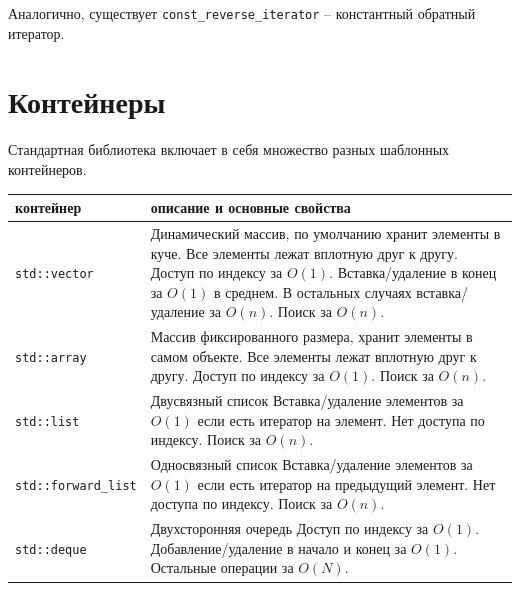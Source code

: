 \documentclass{article}
\begin{document}
Аналогично, существует \texttt{const\_reverse\_iterator} -- константный обратный итератор.

\newpage
\section*{Контейнеры}
Стандартная библиотека включает в себя множество разных шаблонных контейнеров.

\begin{center}
\bgroup
\def\arraystretch{2}%
\begin{tabular}{ p{3.3cm} | p{14cm} }
контейнер & описание и основные свойства \\ \hline

\texttt{std::vector} & 
Динамический массив, по умолчанию хранит элементы в куче. \newline 
Все элементы лежат вплотную друг к другу. \newline 
Доступ по индексу за $O(1)$. Вставка/удаление в конец за $O(1)$ в среднем. \newline
В остальных случаях вставка/удаление за $O(n)$. Поиск за $O(n)$.  \newline 
\\ \hline

\texttt{std::array} &
Массив фиксированного размера, хранит элементы в самом объекте. \newline 
Все элементы лежат вплотную друг к другу. \newline 
Доступ по индексу за $O(1)$. Поиск за $O(n)$. \newline 
\\ \hline

\texttt{std::list} &
Двусвязный список \newline 
Вставка/удаление элементов за $O(1)$ если есть итератор на элемент. \newline 
Нет доступа по индексу. Поиск за $O(n)$. \newline 
\\ \hline


\texttt{std::forward\_list} &
Односвязный список \newline 
Вставка/удаление элементов за $O(1)$ если есть итератор на предыдущий элемент. \newline 
Нет доступа по индексу. Поиск за $O(n)$. \newline 
\\ \hline


\texttt{std::deque} &
Двухсторонняя очередь \newline 
Доступ по индексу за $O(1)$. Добавление/удаление в начало и конец за $O(1)$. \newline 
Остальные операции за $O(N)$. \newline 
\\ \hline


\end{tabular}
\end{center}
\end{document}
